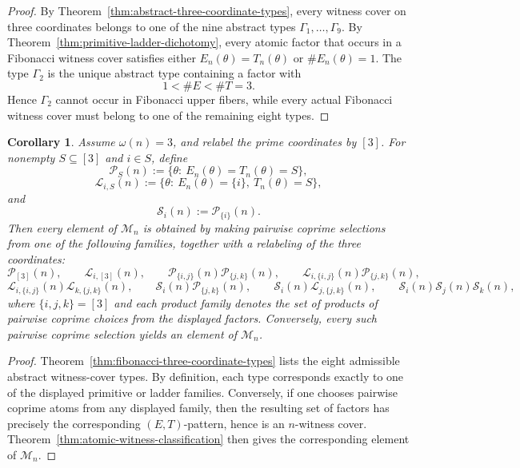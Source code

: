 \documentclass[11pt,letterpaper]{article}
\numberwithin{equation}{section}
\theoremstyle{plain}
\newtheorem{corollary}[theorem]{Corollary}
\theoremstyle{definition}
\theoremstyle{remark}
\begin{document}
\begin{proof}
By Theorem~\ref{thm:abstract-three-coordinate-types}, every witness cover on
three coordinates belongs to one of the nine abstract types
$\Gamma_1,\dots,\Gamma_9$. By
Theorem~\ref{thm:primitive-ladder-dichotomy}, every atomic factor that occurs
in a Fibonacci witness cover satisfies either $E_n(\theta)=T_n(\theta)$ or
$\#E_n(\theta)=1$. The type $\Gamma_2$ is the unique abstract type containing
a factor with
\[
1<\#E<\#T=3.
\]
Hence $\Gamma_2$ cannot occur in Fibonacci upper fibers, while every actual
Fibonacci witness cover must belong to one of the remaining eight types.
\end{proof}

\begin{corollary}
\label{cor:three-coordinate-realization}
Assume $\omega(n)=3$, and relabel the prime coordinates by $[3]$. For
nonempty $S\subseteq [3]$ and $i\in S$, define
\[
\mathcal P_S(n):=\{\theta:\ E_n(\theta)=T_n(\theta)=S\},
\]
\[
\mathcal L_{i,S}(n):=\{\theta:\ E_n(\theta)=\{i\},\ T_n(\theta)=S\},
\]
and
\[
\mathcal S_i(n):=\mathcal P_{\{i\}}(n).
\]
Then every element of $\mathcal M_n$ is obtained by making pairwise coprime
selections from one of the following families, together with a relabeling of
the three coordinates:
\[
\mathcal P_{[3]}(n),
\qquad
\mathcal L_{i,[3]}(n),
\qquad
\mathcal P_{\{i,j\}}(n)\mathcal P_{\{j,k\}}(n),
\qquad
\mathcal L_{i,\{i,j\}}(n)\mathcal P_{\{j,k\}}(n),
\]
\[
\mathcal L_{i,\{i,j\}}(n)\mathcal L_{k,\{j,k\}}(n),
\qquad
\mathcal S_i(n)\mathcal P_{\{j,k\}}(n),
\qquad
\mathcal S_i(n)\mathcal L_{j,\{j,k\}}(n),
\qquad
\mathcal S_i(n)\mathcal S_j(n)\mathcal S_k(n),
\]
where $\{i,j,k\}=[3]$ and each product family denotes the set of products of
pairwise coprime choices from the displayed factors. Conversely, every such
pairwise coprime selection yields an element of $\mathcal M_n$.
\end{corollary}

\begin{proof}
Theorem~\ref{thm:fibonacci-three-coordinate-types} lists the eight admissible
abstract witness-cover types. By definition, each type corresponds exactly to
one of the displayed primitive or ladder families. Conversely, if one chooses
pairwise coprime atoms from any displayed family, then the resulting set of
factors has precisely the corresponding $(E,T)$-pattern, hence is an
$n$-witness cover. Theorem~\ref{thm:atomic-witness-classification} then gives
the corresponding element of $\mathcal M_n$.
\end{proof}
\end{document}
